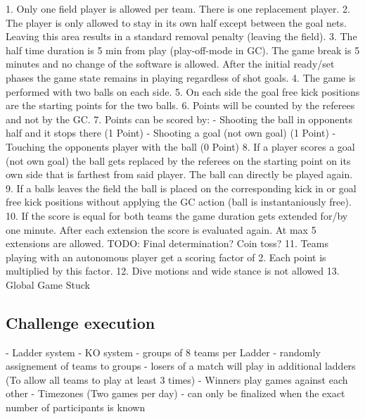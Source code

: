 1. Only one field player is allowed per team. There is one replacement player.
2. The player is only allowed to stay in its own half except between the goal nets. Leaving this area results in a standard removal penalty (leaving the field).
3. The half time duration is 5 min from play (play-off-mode in GC). The game break is 5 minutes and no change of  the software is allowed. After the initial ready/set phases the game state remains in playing regardless of shot goals.
4. The game is performed with two balls on each side.
5. On each side the goal free kick positions are the starting points for the two balls.
6. Points will be counted by the referees and not by the GC.
7. Points can be scored by:
    - Shooting the ball in opponents half and it stops there (1 Point)
    - Shooting a goal (not own goal) (1 Point)
    - Touching the opponents player with the ball (0 Point)
8. If a player scores a goal (not own goal) the ball gets replaced by the referees on the starting point on its own side that is farthest from said player. The ball can directly be played again.
9. If a balls leaves the field the ball is placed on the corresponding kick in or goal free kick positions without applying the GC action (ball is instantaniously free).
10. If the score is equal for both teams the game duration gets extended for/by one minute. After each extension the score is evaluated again. At max 5 extensions are allowed. TODO: Final determination? Coin toss?
11. Teams playing with an autonomous player get a scoring factor of 2. Each point is multiplied by this factor.
12. Dive motions and wide stance is not allowed
13. Global Game Stuck

\subsection{Challenge execution}
- Ladder system
    - KO system 
    - groups of 8 teams per Ladder
    - randomly assignement of teams to groups
    - losers of a match will play in additional ladders (To allow all teams to play at least 3 times)
    - Winners play games against each other
    - Timezones (Two games per day)
    - can only be finalized when the exact number of participants is known